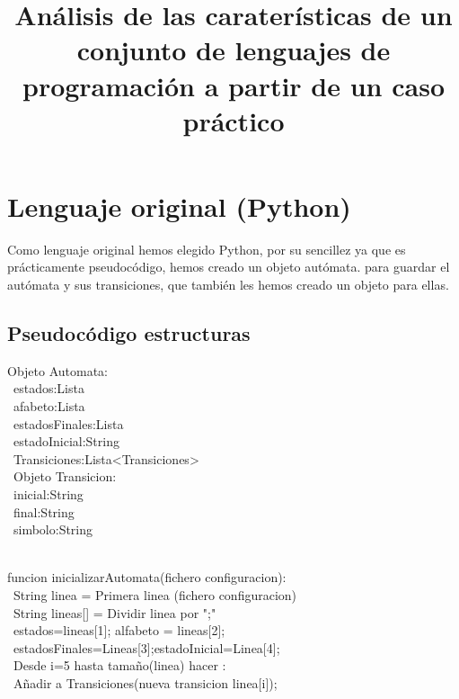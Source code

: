 \documentclass[]{scrartcl}
\title{An\'alisis de las carater\'isticas de un conjunto de lenguajes de programaci\'on a partir de un caso pr\'actico}
\author{}
\begin{document}
\maketitle

\begin{abstract}

\end{abstract}
\tableofcontents
\section{Lenguaje original (Python)}
Como lenguaje original hemos elegido Python, por su sencillez ya que es pr\'acticamente pseudoc\'odigo, hemos creado un objeto aut\'omata. para guardar el aut\'omata y sus transiciones, que tambi\'en les hemos creado un objeto para ellas.
\subsection{Pseudocódigo estructuras}
Objeto Automata:\\ \
\indent estados:Lista\\ \
\indent	afabeto:Lista\\ \
\indent	estadosFinales:Lista\\ \
\indent	estadoInicial:String\\ \
\indent	Transiciones:Lista<Transiciones>\\ \
Objeto Transicion: \\ \
\indent	inicial:String\\ \
\indent	final:String\\ \
\indent	simbolo:String\\ \

funcion inicializarAutomata(fichero configuracion):\\ \
\indent	String linea = Primera linea (fichero configuracion)\\ \
\indent	String lineas[] = Dividir linea por ";"\\ \
\indent	estados=lineas[1]; alfabeto = lineas[2];\\ \
\indent	estadosFinales=Lineas[3];estadoInicial=Linea[4];\\ \
\indent	Desde i=5 hasta tamaño(linea) hacer :\\ \
\indent\indent	Añadir a Transiciones(nueva transicion linea[i]);\\ \
\end{document}
